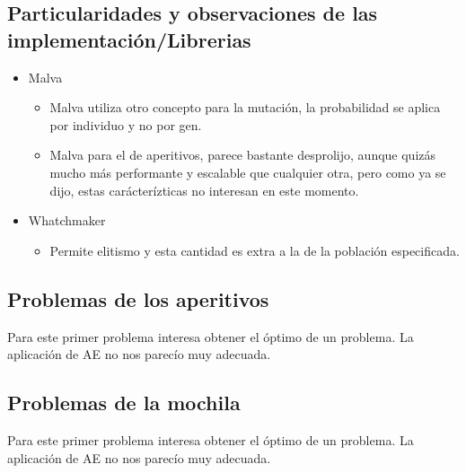 \documentclass[9pt,conference]{IEEEtran}
\begin{document}
	\subsection{Particularidades y observaciones de las implementaci\'on/Librerias}
	\begin{itemize}
		\item Malva
		\begin{itemize}
			\item Malva utiliza otro concepto para la mutaci\'on, la probabilidad se aplica por individuo y no por gen.
			\item Malva para el de aperitivos, parece bastante desprolijo, aunque quiz\'as mucho m\'as performante y escalable que cualquier otra, pero como ya se dijo, estas car\'acter\'izticas no interesan en este momento.
		\end{itemize}

		\item Whatchmaker
		\begin{itemize}	
			\item Permite elitismo y esta cantidad es extra a la de la poblaci\'on especificada.
		\end{itemize}
	\end{itemize}


	\subsection{Problemas de los aperitivos}
	
	Para este primer problema interesa obtener el \'optimo de un problema. La aplicaci\'on de AE no nos parec\'io muy adecuada.

	\subsection{Problemas de la mochila}

	Para este primer problema interesa obtener el \'optimo de un problema. La aplicaci\'on de AE no nos parec\'io muy adecuada.



\end{document}
